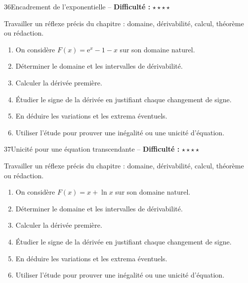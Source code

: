 \documentclass[11pt,a4paper]{article}
\newcommand{\e}{\mathrm{e}}
\newcommand{\etoiles}[1]{\textbf{Difficulté :} #1}
\begin{document}
\begin{exobox}{36}{Encadrement de l'exponentielle -- \etoiles{$\star\star\star\star$}}

\begin{objectifbox}
Travailler un réflexe précis du chapitre : domaine, dérivabilité, calcul, théorème ou rédaction.
\end{objectifbox}

\begin{enumerate}

\item On considère $F(x)=\e^x-1-x$ sur son domaine naturel.

\item Déterminer le domaine et les intervalles de dérivabilité.

\item Calculer la dérivée première.

\item Étudier le signe de la dérivée en justifiant chaque changement de signe.

\item En déduire les variations et les extrema éventuels.

\item Utiliser l'étude pour prouver une inégalité ou une unicité d'équation.

\end{enumerate}

\end{exobox}


\begin{exobox}{37}{Unicité pour une équation transcendante -- \etoiles{$\star\star\star\star$}}

\begin{objectifbox}
Travailler un réflexe précis du chapitre : domaine, dérivabilité, calcul, théorème ou rédaction.
\end{objectifbox}

\begin{enumerate}

\item On considère $F(x)=x+\ln x$ sur son domaine naturel.

\item Déterminer le domaine et les intervalles de dérivabilité.

\item Calculer la dérivée première.

\item Étudier le signe de la dérivée en justifiant chaque changement de signe.

\item En déduire les variations et les extrema éventuels.

\item Utiliser l'étude pour prouver une inégalité ou une unicité d'équation.

\end{enumerate}

\end{exobox}
\end{document}
